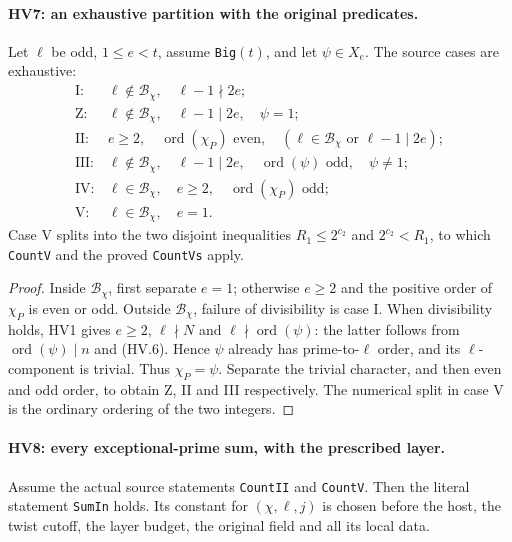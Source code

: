 \paragraph{HV7: an exhaustive partition with the original predicates.}
\label{claim:HV7}
Let $\ell$ be odd, $1\le e<t$, assume \texttt{Big}$(t)$,
and let $\psi\in X_e$.  The source cases are exhaustive:
\[
\begin{array}{ll}
\mathrm{I}:&\ell\notin\mathcal B_\chi,\quad\ell-1\nmid2e;\\
\mathrm{Z}:&\ell\notin\mathcal B_\chi,\quad\ell-1\mid2e,
                                                        \quad\psi=1;\\
\mathrm{II}:&e\ge2,\quad\operatorname{ord}(\chi_P)\text{ even},
                 \quad(\ell\in\mathcal B_\chi\text{ or }\ell-1\mid2e);\\
\mathrm{III}:&\ell\notin\mathcal B_\chi,\quad\ell-1\mid2e,
                 \quad\operatorname{ord}(\psi)\text{ odd},\quad\psi\ne1;\\
\mathrm{IV}:&\ell\in\mathcal B_\chi,\quad e\ge2,
                                    \quad\operatorname{ord}(\chi_P)\text{ odd};\\
\mathrm{V}:&\ell\in\mathcal B_\chi,\quad e=1.
\end{array}
\tag{HV.31}
\]
Case V splits into the two disjoint inequalities
$R_1\le2^{c_2}$ and $2^{c_2}<R_1$, to which
\texttt{CountV} and the proved \texttt{CountVs} apply.

\begin{proof}
Inside $\mathcal B_\chi$, first separate $e=1$; otherwise
$e\ge2$ and the positive order of $\chi_P$ is even or odd.
Outside $\mathcal B_\chi$, failure of divisibility is case I.
When divisibility holds, HV1 gives $e\ge2$, $\ell\nmid N$
and $\ell\nmid\operatorname{ord}(\psi)$: the latter follows
from $\operatorname{ord}(\psi)\mid n$ and (HV.6).
Hence $\psi$ already has prime-to-$\ell$ order, and its
$\ell$-component is trivial.  Thus $\chi_P=\psi$.
Separate the trivial character, and then even and odd order,
to obtain Z, II and III respectively.  The numerical split in
case V is the ordinary ordering of the two integers.
\end{proof}

\paragraph{HV8: every exceptional-prime sum, with the prescribed layer.}
\label{claim:HV8}
Assume the actual source statements \texttt{CountII} and
\texttt{CountV}.  Then the literal statement \texttt{SumIn}
holds.  Its constant for $(\chi,\ell,j)$ is chosen before
the host, the twist cutoff, the layer budget, the original
field and all its local data.

